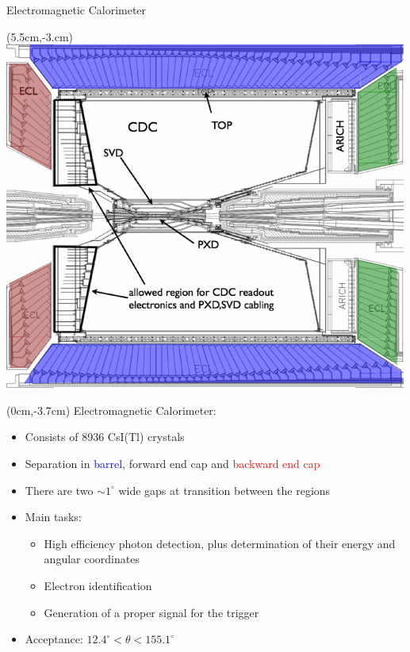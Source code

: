 \documentclass[8pt]{beamer}
\begin{document}
\begin{frame}{Electromagnetic Calorimeter}
	\begin{textblock*}{6cm}(5.5cm,-3.cm)
		\includegraphics[width=\textwidth]{VBilder/ecl2}
	\end{textblock*}

\begin{textblock*}{5.2cm}(0cm,-3.7cm)
	Electromagnetic Calorimeter:
	\begin{itemize}
		\item Consists of 8936 CsI(Tl) crystals
		\item Separation in \textcolor{blue}{barrel}, \textcolor{OliveGreen}{forward end cap} and \textcolor{red}{backward end cap}
		\item There are two $\sim 1^{\circ}$ wide gaps at transition between the regions
		\item Main tasks:
		\begin{itemize}
			\item High efficiency photon detection, plus determination of their energy and angular coordinates
			\item Electron identification
			\item Generation of a proper signal for the trigger
		\end{itemize}
		\item Acceptance: $12.4^{\circ} < \theta < 155.1^{\circ}$ 
	\end{itemize}
\end{textblock*}


\end{frame}
\end{document}
